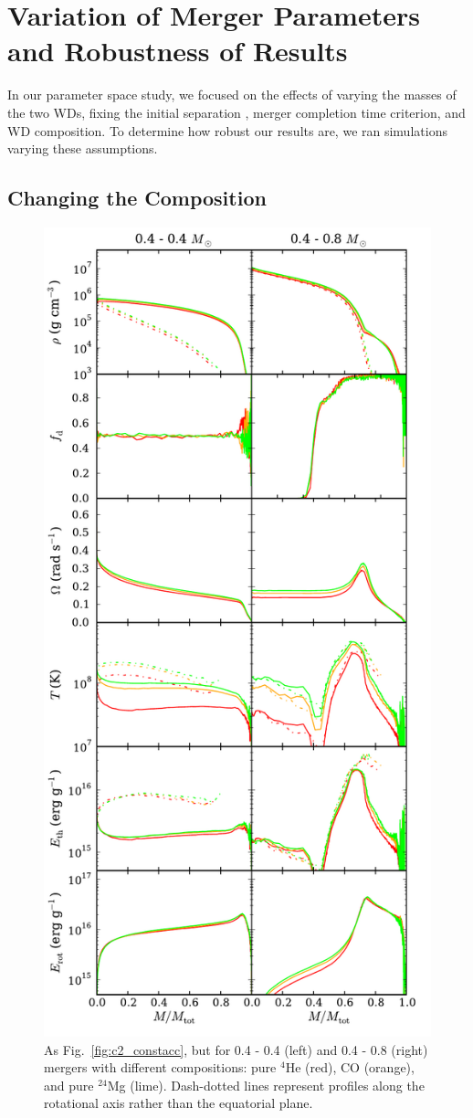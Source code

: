 \section{Variation of Merger Parameters and Robustness of Results}
\label{sec:c2_variation}

In our parameter space study, we focused on the effects of varying the masses of the two WDs, fixing the initial separation {\azero}, merger completion time criterion, and WD composition.  To determine how robust our results are, we ran simulations varying these assumptions.

\subsection{Changing the Composition}

\begin{figure}
\centering
\includegraphics[angle=0,width=0.5\columnwidth]{chapter2_zhu+13/figures/compcomp.pdf}
\caption{As Fig.~\ref{fig:c2_constacc}, but for 0.4 - 0.4 {\Msun} (left) and 0.4 - 0.8 {\Msun} (right) mergers with different compositions: pure $^4$He (red), CO (orange), and pure $^{24}$Mg (lime).  Dash-dotted lines represent profiles along the rotational axis rather than the equatorial plane.}
\label{fig:c2_compcomp}
\end{figure}

